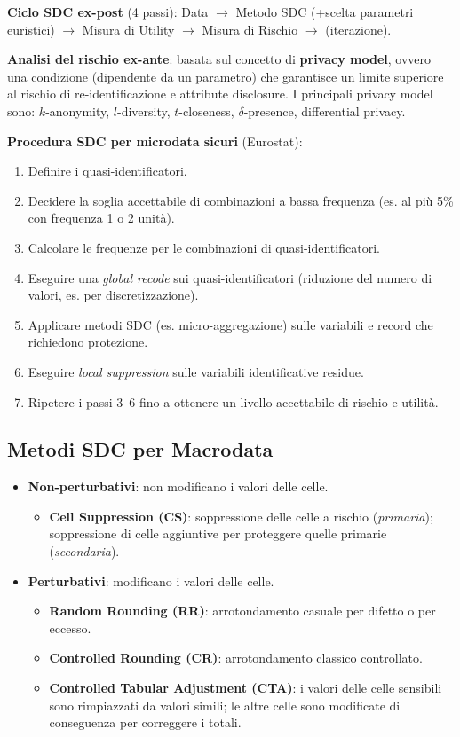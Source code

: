 \documentclass[a4paper,11pt]{article}
\begin{document}
\begin{definizione}
\textbf{Ciclo SDC ex-post} (4 passi): Data $\to$ Metodo SDC (+scelta parametri euristici) $\to$ Misura di Utility $\to$ Misura di Rischio $\to$ (iterazione).

\textbf{Analisi del rischio ex-ante}: basata sul concetto di \textbf{privacy model}, ovvero una condizione (dipendente da un parametro) che garantisce un limite superiore al rischio di re-identificazione e attribute disclosure. I principali privacy model sono: $k$-anonymity, $l$-diversity, $t$-closeness, $\delta$-presence, differential privacy.
\end{definizione}

\textbf{Procedura SDC per microdata sicuri} (Eurostat):
\begin{enumerate}
  \item Definire i quasi-identificatori.
  \item Decidere la soglia accettabile di combinazioni a bassa frequenza (es. al pi\`{u} 5\% con frequenza 1 o 2 unità).
  \item Calcolare le frequenze per le combinazioni di quasi-identificatori.
  \item Eseguire una \emph{global recode} sui quasi-identificatori (riduzione del numero di valori, es. per discretizzazione).
  \item Applicare metodi SDC (es. micro-aggregazione) sulle variabili e record che richiedono protezione.
  \item Eseguire \emph{local suppression} sulle variabili identificative residue.
  \item Ripetere i passi 3--6 fino a ottenere un livello accettabile di rischio e utilit\`{a}.
\end{enumerate}

\subsection{Metodi SDC per Macrodata}

\begin{itemize}
  \item \textbf{Non-perturbativi}: non modificano i valori delle celle.
    \begin{itemize}
      \item \textbf{Cell Suppression (CS)}: soppressione delle celle a rischio (\emph{primaria}); soppressione di celle aggiuntive per proteggere quelle primarie (\emph{secondaria}).
    \end{itemize}
  \item \textbf{Perturbativi}: modificano i valori delle celle.
    \begin{itemize}
      \item \textbf{Random Rounding (RR)}: arrotondamento casuale per difetto o per eccesso.
      \item \textbf{Controlled Rounding (CR)}: arrotondamento classico controllato.
      \item \textbf{Controlled Tabular Adjustment (CTA)}: i valori delle celle sensibili sono rimpiazzati da valori simili; le altre celle sono modificate di conseguenza per correggere i totali.
    \end{itemize}
\end{itemize}
\end{document}

